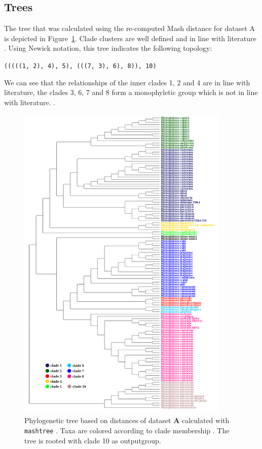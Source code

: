 \subsection*{Trees}
The tree that was calculated using the re-computed Mash distance for dataset
A is depicted in Figure~\ref{fig:mandalMashTree}. Clade clusters are well
defined and in line with literature
\cite{abadPhytophthoraTaxonomicPhylogenetic2023a,yangExpandedPhylogenyGenus2017}.
Using Newick notation, this tree indicates the following topology: 

\texttt{(((((1, 2), 4), 5), (((7, 3), 6), 8)), 10)}

We can see that the relationships of the inner clades 1, 2 and 4 are in line
with literature, the clades 3, 6, 7 and 8 form a monophyletic group which is not
in line with literature.
\cite{abadPhytophthoraTaxonomicPhylogenetic2023a,yangExpandedPhylogenyGenus2017}.

\begin{figure}
  \centering
  \includegraphics[width=0.9\textwidth]{figures/mashtree_mandal_tree_k21_s2000.png}
  \caption[Phylogenetic tree based on distances of dataset \textbf{A} calculated with
  \texttt{mashtree}]{Phylogenetic tree based on distances of dataset \textbf{A}
  calculated with
  \texttt{mashtree}
  \cite{ondovMashFastGenome2016,katzMashtreeRapidComparison2019}. Taxa are
  colored according to clade membership
  \cite{abadPhytophthoraTaxonomicPhylogenetic2023a}. The tree is rooted with
  clade 10 as outputgroup.}
  \label{fig:mandalMashTree}
\end{figure}

